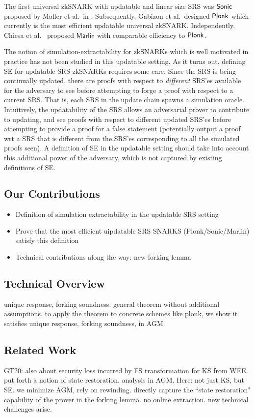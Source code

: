 The first universal zkSNARK with updatable and linear size SRS was
${\textnormal{\textsf{Sonic}}}$ proposed by Maller et al.~in \cite{CCS:MBKM19}. Subsequently, Gabizon et
al.~designed $\textnormal{\textsf{Plonk}}$ \cite{EPRINT:GabWilCio19} which currently is the
most efficient updatable universal zkSNARK. Independently, Chiesa et
al.~\cite{EC:CHMMVW20} proposed $\textsf{Marlin}$ with comparable efficiency to
$\textnormal{\textsf{Plonk}}$.

The notion of simulation-extractability for zkSNARKs which is well motivated in practice has not been studied in this updatable setting. As it turns out, defining SE for updatable SRS zkSNARKs requires some care. Since the SRS is being continually updated, there are proofs with respect to \textit{different} SRS'es available for the adversary to see before attempting to forge a proof with respect to a current SRS. 
That is, each SRS in the update chain spawns a simulation oracle. Intuitively, the updatability of the SRS allows an adversarial prover to contribute to updating, and see proofs with respect to different updated SRS'es before attempting to provide a proof for a false statement (potentially output a proof wrt a SRS that is different from the SRS'es corresponding to all the simulated proofs seen). A definition of SE in the updatable setting should take into account this additional power of the adversary, which is not captured by existing definitions of SE.

\subsection{Our Contributions}
\begin{itemize}
    \item Definition of simulation extractability in the updatable SRS setting
    
    \item Prove that the most efficient uipdatable SRS SNARKS (Plonk/Sonic/Marlin) satisfy this definition
    
    \item
    Technical contributions along the way: new forking lemma
\end{itemize}



\subsection{Technical Overview}
unique response, forking soundness. general theorem without additional assumptions. to apply the theorem to concrete schemes like plonk, we show it satisfies unique response, forking soundness, in AGM.

\subsection{Related Work}
GT20: also about security loss incurred by FS transformation for KS from WEE. put forth a notion of state restoration. analysis in AGM.
Here: not just KS, but SE. we minimize AGM, rely on rewinding. directly capture the ``state restoration" capability of the prover in the forking lemma.
no online extraction. new technical challenges arise.

